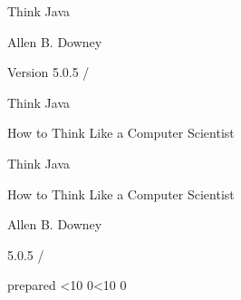 \documentclass[12pt]{book}
\title{\thetitle}
\author{Allen B. Downey}
\def\prepdate{\number\year\textperiodcentered\ifnum\month<10 0\fi\number\month\textperiodcentered\ifnum\day<10 0\fi\number\day}
\newcommand{\theversion}{5.0.5 / \gitversion}
\theoremstyle{definition}
\begin{document}

\begin{htmlonly}


{\Large Think Java}

{\large Allen B. Downey}

Version \theversion

\setcounter{chapter}{-1}

\end{htmlonly}




\begin{latexonly}



\thispagestyle{empty}

\begin{flushright}
\sffamily
\vspace*{2.5in}

{\huge Think Java}

\vspace{1in}

{\LARGE How to Think Like a Computer Scientist}

\vfill

\end{flushright}


\cleardoublepage

\pagebreak
\thispagestyle{empty}

\begin{flushright}
\sffamily
\vspace*{2.5in}

{\huge Think Java}

\vspace{0.25in}

{\LARGE How to Think Like a Computer Scientist}

\vspace{1in}

{\Large
Allen B. Downey
}


\vspace{1in}

{\Large \theversion}
\smallskip\par
prepared \prepdate


\end{flushright}
\end{latexonly}
\end{document}

